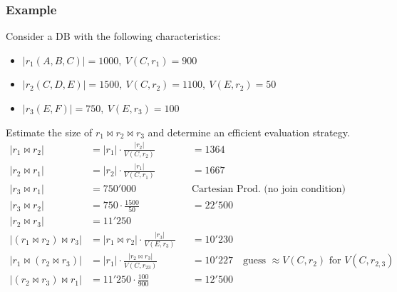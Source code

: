 \subsubsection{Example}
Consider a DB with the following characteristics:
\begin{itemize}[label=\(\rhd\)]
    \item $|r_1(A,B,C)|=1000,\ V(C,r_1) = 900$
    \item $|r_2(C,D,E)|=1500,\ V(C,r_2) = 1100,\ V(E,r_2)=50$
    \item $|r_3(E,F)|=750,\ V(E,r_3)=100$
\end{itemize}
Estimate the size of $r_1 \bowtie r_2 \bowtie r_3$ and determine an efficient evaluation strategy.
\begin{align*}
    |r_1 \bowtie r_2| &= |r_1| \cdot \frac{|r_2|}{V(C,r_2)} &&= 1364 \\
    |r_2 \bowtie r_1|&= |r_2| \cdot \frac{|r_1|}{V(C,r_1)} &&= 1667\\
    |r_3 \bowtie r_1| &= 750'000 &&\text{Cartesian Prod. (no join condition)}\\
    |r_3 \bowtie r_2| &= 750 \cdot \frac{1500}{50} &&= 22'500 \\
    |r_2 \bowtie r_3| &= 11'250 \\
    |(r_1 \bowtie r_2) \bowtie r_3| &= |r_1 \bowtie r_2| \cdot \frac{|r_3|}{V(E,r_3)} &&= 10'230 \\
    |r_1 \bowtie (r_2 \bowtie r_3)| &= |r_1| \cdot \frac{|r_2 \bowtie r_3|}{V(C, r_{23})} &&= 10'227 \quad \text{guess $\approx V(C,r_2)$ for $V(C,r_{2,3})$}\\
    |(r_2 \bowtie r_3) \bowtie r_1| &= 11'250 \cdot \frac{100}{900} &&= 12'500
\end{align*}


